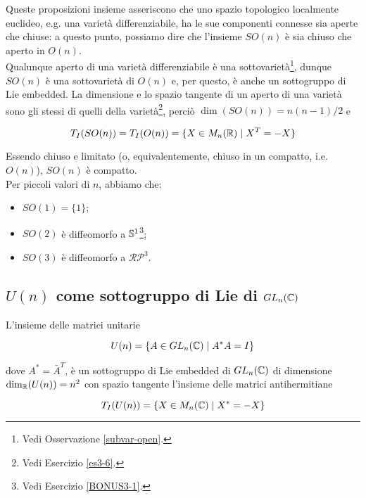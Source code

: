Queste proposizioni insieme asseriscono che uno spazio topologico localmente euclideo, e.g. una varietà differenziabile, ha le sue componenti connesse sia aperte che chiuse: a questo punto, possiamo dire che l'insieme $ SO(n) $ è sia chiuso che aperto in $ O(n) $.\\
Qualunque aperto di una varietà differenziabile è una sottovarietà\footnote{%
	Vedi Osservazione \ref{subvar-open}.%
}, dunque $ SO(n) $ è una sottovarietà di $ O(n) $ e, per questo, è anche un sottogruppo di Lie embedded. La dimensione e lo spazio tangente di un aperto di una varietà sono gli stessi di quelli della varietà\footnote{%
	Vedi Esercizio \ref{es3-6}.%
}, perciò $ \dim(SO(n)) = n(n-1)/2 $ e

\begin{equation}
	T_{I}(SO(n)) = T_{I}(O(n)) = \{ X \in M_{n}(\R) \mid X^{T} = -X \}
\end{equation}

Essendo chiuso e limitato (o, equivalentemente, chiuso in un compatto, i.e. $ O(n) $), $ SO(n) $ è compatto.\\
Per piccoli valori di $ n $, abbiamo che:

\begin{itemize}
	\item $ SO(1) = \{ 1 \} $;
	
	\item $ SO(2) $ è diffeomorfo a $ \S^{1} $\footnote{%
		Vedi Esercizio \ref{BONUS3-1}.%
	};
	
	\item $ SO(3) $ è diffeomorfo a $ \mathcal{RP}^{3} $.
\end{itemize}

\subsection{$ U(n) $ come sottogruppo di Lie di $ GL_{n}(\C) $}

L'insieme delle matrici unitarie

\begin{equation}
	U(n) = \{ A \in GL_{n}(\C) \mid A^{*} A = I \}
\end{equation}

dove $ A^{*} = \bar{A}^{T} $, è un sottogruppo di Lie embedded di $ GL_{n}(\C) $ di dimensione $ \dim_{\R}(U(n)) = n^{2} $ con spazio tangente l'insieme delle matrici antihermitiane

\begin{equation}
	T_{I}(U(n)) = \{ X \in M_{n}(\C) \mid X^{*} = -X \}
\end{equation}

